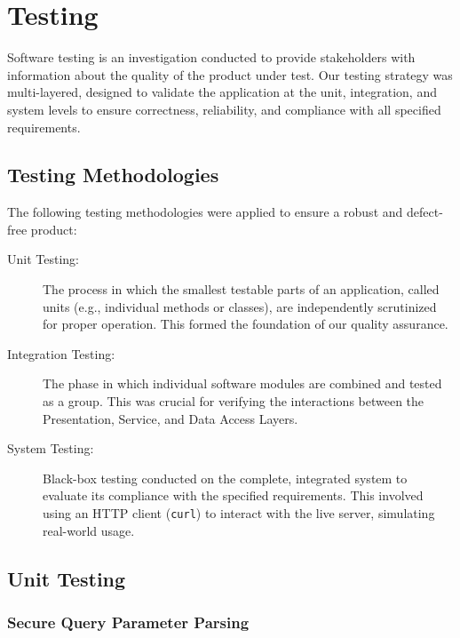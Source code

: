 \documentclass[12pt, a4paper]{report}
\begin{document}
\clearpage

\chapter{Testing}
Software testing is an investigation conducted to provide stakeholders with information about the quality of the product under test. Our testing strategy was multi-layered, designed to validate the application at the unit, integration, and system levels to ensure correctness, reliability, and compliance with all specified requirements.

\section{Testing Methodologies}
The following testing methodologies were applied to ensure a robust and defect-free product:
\begin{description}
    \item[Unit Testing:] The process in which the smallest testable parts of an application, called units (e.g., individual methods or classes), are independently scrutinized for proper operation. This formed the foundation of our quality assurance.
    \item[Integration Testing:] The phase in which individual software modules are combined and tested as a group. This was crucial for verifying the interactions between the Presentation, Service, and Data Access Layers.
    \item[System Testing:] Black-box testing conducted on the complete, integrated system to evaluate its compliance with the specified requirements. This involved using an HTTP client (\lstinline|curl|) to interact with the live server, simulating real-world usage.
\end{description}

\section{Unit Testing}

\subsection{Secure Query Parameter Parsing}
\end{document}
